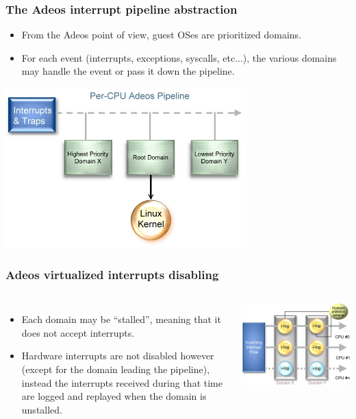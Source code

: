 \begin{frame}
  \frametitle{The Adeos interrupt pipeline abstraction}
  \begin{itemize}
  \item From the Adeos point of view, guest OSes are prioritized
    domains.
  \item For each event (interrupts, exceptions, syscalls, etc...), the
    various domains may handle the event or pass it down the pipeline.
  \end{itemize}
  \begin{center}
    \includegraphics[width=0.7\textwidth]{slides/sysdev-realtime/adeos-interrupt-pipeline1.jpg}
  \end{center}
\end{frame}

\begin{frame}
  \frametitle{Adeos virtualized interrupts disabling}
  \begin{columns}
    \begin{itemize}
    \item Each domain may be “stalled”, meaning that it does not
      accept interrupts.
    \item Hardware interrupts are not disabled however (except for the
      domain leading the pipeline), instead the interrupts received
      during that time are logged and replayed when the domain is
      unstalled.
    \end{itemize}
    \includegraphics[width=\textwidth]{slides/sysdev-realtime/adeos-interrupt-pipeline2.jpg}
  \end{columns}
\end{frame}

